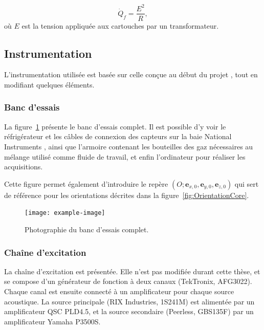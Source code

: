 \begin{equation}
	\dot Q_f = \frac{E^2}{R},
	\label{eq:Qf_Definition}
\end{equation}
où $E$ est la tension appliquée aux cartouches par un transformateur.



\subsection{Instrumentation}
L'instrumentation utilisée est basée sur celle conçue au début du projet \cite{ramadan_design_2021}, tout en modifiant quelques éléments.


\subsubsection{Banc d'essais}
La figure~\ref{fig:BancEssaisComplet} présente le banc d'essais complet. Il est possible d'y voir le réfrigérateur et les câbles de connexion des capteurs sur la baie National Instruments , ainsi que l'armoire contenant les bouteilles des gaz nécessaires au mélange utilisé comme fluide de travail, et enfin l'ordinateur pour réaliser les acquisitions.\smallskip

Cette figure permet également d'introduire le repère $(O;\mathbf e_{x,0},\mathbf e_{y,0},\mathbf e_{z,0})$ qui sert de référence pour les orientations décrites dans la figure~\ref{fig:OrientationCore}.

\begin{figure}[!ht]
	\centering
%	
\texttt{[image: example-image]}
	\caption{Photographie du banc d'essais complet.}
	\label{fig:BancEssaisComplet}
\end{figure}


\subsubsection{Chaîne d'excitation}
La chaîne d'excitation est présentée. Elle n'est pas modifiée durant cette thèse, et se compose d'un générateur de fonction à deux canaux (TekTronix, AFG3022). Chaque canal est ensuite connecté à un amplificateur pour chaque source acoustique. La source principale (RIX Industries, 1S241M) est alimentée par un amplificateur QSC PLD4.5, et la source secondaire (Peerless, GBS135F) par un amplificateur Yamaha P3500S.\medskip


